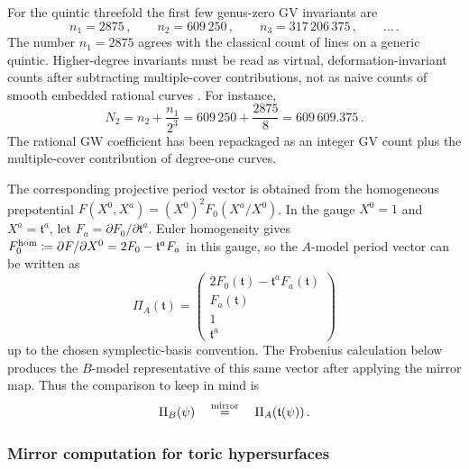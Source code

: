 \begin{example}\label{ex:L2-quintic-GV}
For the quintic threefold the first few genus-zero GV invariants are
\begin{equation}
    n_1=2875\, ,
    \qquad
    n_2=609\,250\, ,
    \qquad
    n_3=317\,206\,375\, ,
    \qquad \ldots\, .
\end{equation}
The number $n_1=2875$ agrees with the classical count of lines on a
generic quintic.  Higher-degree invariants must be read as virtual,
deformation-invariant counts after subtracting multiple-cover
contributions, not as naive counts of smooth embedded rational curves
\cite{Candelas:1990rm}.  For instance,
\begin{equation}
    N_2
    =
    n_2+\frac{n_1}{2^3}
    =
    609\,250+\frac{2875}{8}
    =
    609\,609.375\, .
\end{equation}
The rational GW coefficient has been repackaged as an integer GV count
plus the multiple-cover contribution of degree-one curves.
\end{example}

The corresponding projective period vector is obtained from the
homogeneous prepotential
$F(X^0,X^a)=(X^0)^2F_0(X^a/X^0)$.  In the gauge $X^0=1$ and
$X^a=\mathfrak t^a$, let
$F_a=\partial F_0/\partial\mathfrak t^a$.  Euler homogeneity gives
$F_0^{\rm hom}\coloneqq \partial F/\partial X^0=2F_0-\mathfrak t^aF_a$ in
this gauge, so the $A$-model period vector can be written as
\begin{equation}\label{eq:L2-Amodel-period-vector}
    \Pi_A(\mathfrak t)
    =
    \begin{pmatrix}
        2F_0(\mathfrak t)-\mathfrak t^aF_a(\mathfrak t)\\
        F_a(\mathfrak t)\\
        1\\
        \mathfrak t^a
    \end{pmatrix}
\end{equation}
up to the chosen symplectic-basis convention.  The Frobenius
calculation below produces the $B$-model representative of this same
vector after applying the mirror map.  Thus the comparison to keep in
mind is
\begin{equation}
    \Pi_B(\psi)
    \quad\stackrel{\rm mirror}{=}\quad
    \Pi_A(\mathfrak t(\psi))\, .
\end{equation}

\subsubsection*{Mirror computation for toric hypersurfaces}

